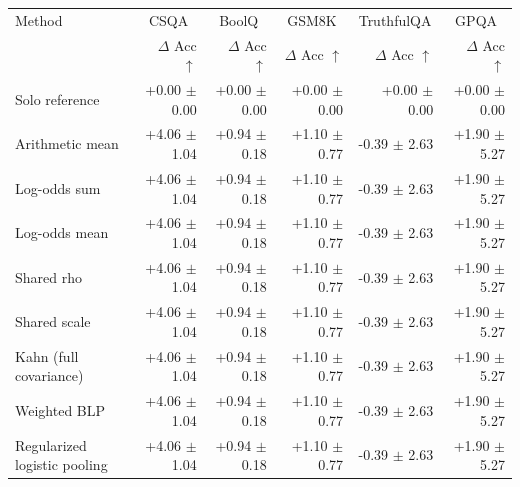 \begin{tabular}{lrrrrr}
\toprule
Method & \multicolumn{1}{c}{CSQA} & \multicolumn{1}{c}{BoolQ} & \multicolumn{1}{c}{GSM8K} & \multicolumn{1}{c}{TruthfulQA} & \multicolumn{1}{c}{GPQA} \\
 & $\Delta$ Acc $\uparrow$ & $\Delta$ Acc $\uparrow$ & $\Delta$ Acc $\uparrow$ & $\Delta$ Acc $\uparrow$ & $\Delta$ Acc $\uparrow$ \\
\midrule
Solo reference & +0.00 {\scriptsize $\pm$ 0.00} & +0.00 {\scriptsize $\pm$ 0.00} & +0.00 {\scriptsize $\pm$ 0.00} & +0.00 {\scriptsize $\pm$ 0.00} & +0.00 {\scriptsize $\pm$ 0.00} \\
Arithmetic mean & +4.06 {\scriptsize $\pm$ 1.04} & +0.94 {\scriptsize $\pm$ 0.18} & +1.10 {\scriptsize $\pm$ 0.77} & -0.39 {\scriptsize $\pm$ 2.63} & +1.90 {\scriptsize $\pm$ 5.27} \\
Log-odds sum & +4.06 {\scriptsize $\pm$ 1.04} & +0.94 {\scriptsize $\pm$ 0.18} & +1.10 {\scriptsize $\pm$ 0.77} & -0.39 {\scriptsize $\pm$ 2.63} & +1.90 {\scriptsize $\pm$ 5.27} \\
Log-odds mean & +4.06 {\scriptsize $\pm$ 1.04} & +0.94 {\scriptsize $\pm$ 0.18} & +1.10 {\scriptsize $\pm$ 0.77} & -0.39 {\scriptsize $\pm$ 2.63} & +1.90 {\scriptsize $\pm$ 5.27} \\
Shared rho & +4.06 {\scriptsize $\pm$ 1.04} & +0.94 {\scriptsize $\pm$ 0.18} & +1.10 {\scriptsize $\pm$ 0.77} & -0.39 {\scriptsize $\pm$ 2.63} & +1.90 {\scriptsize $\pm$ 5.27} \\
Shared scale & +4.06 {\scriptsize $\pm$ 1.04} & +0.94 {\scriptsize $\pm$ 0.18} & +1.10 {\scriptsize $\pm$ 0.77} & -0.39 {\scriptsize $\pm$ 2.63} & +1.90 {\scriptsize $\pm$ 5.27} \\
Kahn (full covariance) & +4.06 {\scriptsize $\pm$ 1.04} & +0.94 {\scriptsize $\pm$ 0.18} & +1.10 {\scriptsize $\pm$ 0.77} & -0.39 {\scriptsize $\pm$ 2.63} & +1.90 {\scriptsize $\pm$ 5.27} \\
Weighted BLP & +4.06 {\scriptsize $\pm$ 1.04} & +0.94 {\scriptsize $\pm$ 0.18} & +1.10 {\scriptsize $\pm$ 0.77} & -0.39 {\scriptsize $\pm$ 2.63} & +1.90 {\scriptsize $\pm$ 5.27} \\
Regularized logistic pooling & +4.06 {\scriptsize $\pm$ 1.04} & +0.94 {\scriptsize $\pm$ 0.18} & +1.10 {\scriptsize $\pm$ 0.77} & -0.39 {\scriptsize $\pm$ 2.63} & +1.90 {\scriptsize $\pm$ 5.27} \\

\end{tabular}
